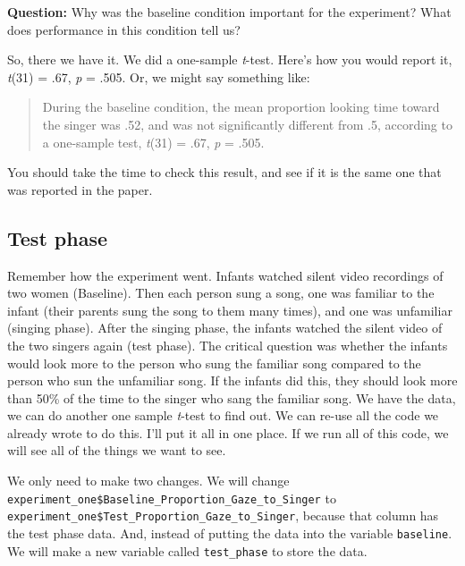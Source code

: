 \documentclass[
]{book}
\newenvironment{Shaded}{\begin{snugshade}}{\end{snugshade}}
\newcommand{\FunctionTok}[1]{\textcolor[rgb]{0.13,0.29,0.53}{\textbf{#1}}}
\newcommand{\NormalTok}[1]{#1}
\newcommand{\OtherTok}[1]{\textcolor[rgb]{0.56,0.35,0.01}{#1}}
\newcommand{\SpecialCharTok}[1]{\textcolor[rgb]{0.81,0.36,0.00}{\textbf{#1}}}
\begin{document}
\textbf{Question:} Why was the baseline condition important for the experiment? What does performance in this condition tell us?

So, there we have it. We did a one-sample \emph{t}-test. Here's how you would report it, \emph{t}(31) = .67, \emph{p} = .505. Or, we might say something like:

\begin{quote}
During the baseline condition, the mean proportion looking time toward the singer was .52, and was not significantly different from .5, according to a one-sample test, \emph{t}(31) = .67, \emph{p} = .505.
\end{quote}

You should take the time to check this result, and see if it is the same one that was reported in the paper.

\hypertarget{test-phase}{%
\subsection{Test phase}\label{test-phase}}

Remember how the experiment went. Infants watched silent video recordings of two women (Baseline). Then each person sung a song, one was familiar to the infant (their parents sung the song to them many times), and one was unfamiliar (singing phase). After the singing phase, the infants watched the silent video of the two singers again (test phase). The critical question was whether the infants would look more to the person who sung the familiar song compared to the person who sun the unfamiliar song. If the infants did this, they should look more than 50\% of the time to the singer who sang the familiar song. We have the data, we can do another one sample \emph{t}-test to find out. We can re-use all the code we already wrote to do this. I'll put it all in one place. If we run all of this code, we will see all of the things we want to see.

We only need to make two changes. We will change \texttt{experiment\_one\$Baseline\_Proportion\_Gaze\_to\_Singer} to \texttt{experiment\_one\$Test\_Proportion\_Gaze\_to\_Singer}, because that column has the test phase data. And, instead of putting the data into the variable \texttt{baseline}. We will make a new variable called \texttt{test\_phase} to store the data.

\begin{Shaded}
\end{Shaded}
\end{document}
